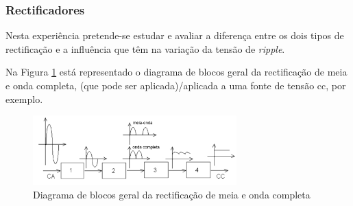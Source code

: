\subsubsection{Rectificadores}
\label{sec:rectificadoresfiltros}
Nesta experiência pretende-se estudar e avaliar a diferença entre os dois tipos de rectificação e a influência que têm na variação da tensão de \textit{ripple}. 

Na Figura \ref{fig:blocosrectificacao} está representado o diagrama de blocos geral da rectificação de meia e onda completa, (que pode ser aplicada)/aplicada a uma fonte de tensão \acrshort{cc}, por exemplo. 

\begin{figure}[hbtp]
	\centering
	\includegraphics[width=0.7\textwidth]{figures/diagramablocosrectificacao.png}
	\caption{Diagrama de blocos geral da rectificação de meia e onda completa}
	\label{fig:blocosrectificacao}
\end{figure}


